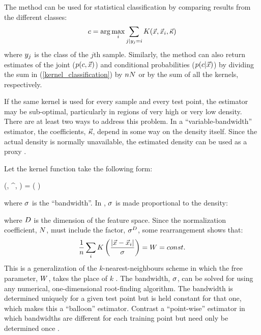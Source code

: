 The method can be used for statistical classification by comparing
results from the different classes:
\begin{equation}
	c = \arg \max_i \sum_{j|y_j = i} K(\vec {x}, \vec {x}_i, \vec \kappa)
	\label{kernel_classification}
\end{equation}
where $y_j$ is the class of the $j$th sample.
Similarly, the method can also return estimates of
the joint ($p(c, \vec x)$) and conditional probabilities 
($p(c |\vec x)$)
by dividing the sum in (\ref{kernel_classification})
by $n N$ or by the sum of all the kernels, respectively. 

If the same kernel is used for every sample and every test point, the estimator
may be sub-optimal, particularly in regions of very high or very low density.
There are at least two ways to address this problem.
In a ``variable-bandwidth'' estimator, the coefficients, $\vec \kappa$, depend in some
way on the density itself. 
Since the actual density is normally unavailable, the
estimated density can be used as a proxy
\citep{Terrell_Scott1992,Mills2011}.

Let the kernel function take the following form:
\begin{eqnnon}
	\vectorkernel(\point, \point^\prime, \bandwidth) = \scalarkernel \left (\frac{|\point - \point^\prime|}{\bandwidth} \right )
	\label{scalar_kernel_def}
\end{eqnnon}
where $\sigma$ is the ``bandwidth''. 
In \citet{Mills2011}, $\sigma$ is made proportional to the density:
\begin{eqnnon}
	\bandwidth \propto {} \approx {}
	\label{setting_the_bandwidth}
\end{eqnnon}
where $D$ is the dimension of the feature space.
Since the normalization coefficient, $N$, must include the factor,
${\sigma^D}$, some rearrangement shows that:
\begin{equation}
	\frac{1}{n} \sum_i K \left (\frac{|\vec {x} - \vec {x}_i|}{\sigma} \right ) = W = const.
	\label{agf_def}
\end{equation}
This is a generalization of the $k$-nearest-neighbours scheme in which the
free parameter, $W$, takes the place of $k$ \citep{Mills2009,Mills2011}.
The bandwidth, $\sigma$, can be solved
for using any numerical, one-dimensional root-finding algorithm.
The bandwidth is determined uniquely for a given test point but is held constant for that
one, which makes this a ``balloon'' estimator. 
Contrast a ``point-wise'' estimator
in which bandwidths are different for each training point but need only be determined once
\citep{Terrell_Scott1992}.

